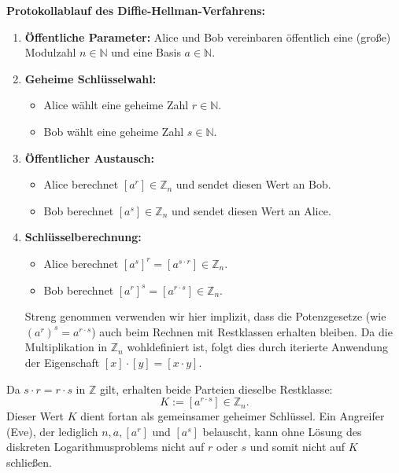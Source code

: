 \begin{math-stroke}
\textbf{Protokollablauf des Diffie-Hellman-Verfahrens:}
\begin{enumerate}[label=\textbf{(\arabic*)}]
    \item \textbf{Öffentliche Parameter:} Alice und Bob vereinbaren öffentlich eine (große) Modulzahl $n \in \mathbb{N}$ und eine Basis $a \in \mathbb{N}$.
    \item \textbf{Geheime Schlüsselwahl:}
    \begin{itemize}
        \item Alice wählt eine geheime Zahl $r \in \mathbb{N}$.
        \item Bob wählt eine geheime Zahl $s \in \mathbb{N}$.
    \end{itemize}
    \item \textbf{Öffentlicher Austausch:}
    \begin{itemize}
        \item Alice berechnet $[a^r] \in \mathbb{Z}_n$ und sendet diesen Wert an Bob.
        \item Bob berechnet $[a^s] \in \mathbb{Z}_n$ und sendet diesen Wert an Alice.
    \end{itemize}
    \item \textbf{Schlüsselberechnung:}
    \begin{itemize}
        \item Alice berechnet $[a^s]^r = [a^{s \cdot r}] \in \mathbb{Z}_n$.
        \item Bob berechnet $[a^r]^s = [a^{r \cdot s}] \in \mathbb{Z}_n$.
    \end{itemize}
    \begin{explanation-of-steps}
    Streng genommen verwenden wir hier implizit, dass die Potenzgesetze (wie $(a^r)^s = a^{r \cdot s}$) auch beim Rechnen mit Restklassen erhalten bleiben. Da die Multiplikation in $\mathbb{Z}_n$ wohldefiniert ist, folgt dies durch iterierte Anwendung der Eigenschaft $[x] \cdot [y] = [x \cdot y]$.
    \end{explanation-of-steps}
\end{enumerate}
Da $s \cdot r = r \cdot s$ in $\mathbb{Z}$ gilt, erhalten beide Parteien dieselbe Restklasse:
\begin{equation}\label{eq:dh-schluessel}
K := [a^{r \cdot s}] \in \mathbb{Z}_n.
\end{equation}
Dieser Wert $K$ dient fortan als gemeinsamer geheimer Schlüssel. Ein Angreifer (Eve), der lediglich $n, a, [a^r]$ und $[a^s]$ belauscht, kann ohne Lösung des diskreten Logarithmusproblems nicht auf $r$ oder $s$ und somit nicht auf $K$ schließen.
\end{math-stroke}

